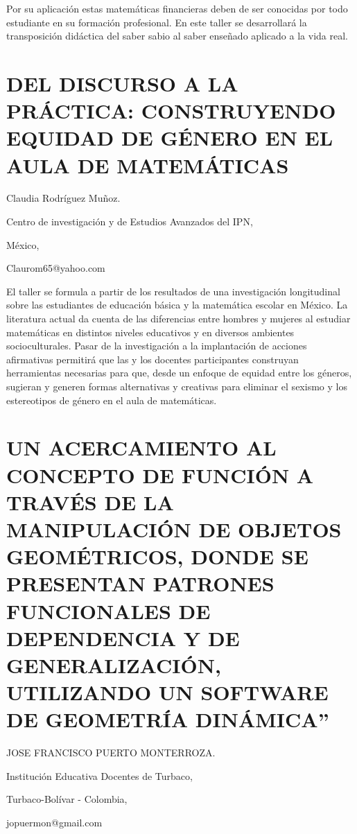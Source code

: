 Por su aplicación estas matemáticas financieras deben de ser conocidas
por todo estudiante en su formación profesional. En este taller se
desarrollará la transposición didáctica del saber sabio al saber enseñado
aplicado a la vida real.


\section{\uppercase{ Del discurso a la práctica: construyendo equidad de
género en el aula de Matemáticas}}

\begin{datos}

Claudia Rodríguez Muñoz.

Centro de investigación y de Estudios Avanzados del IPN,

México,

Claurom65@yahoo.com

\end{datos}

El taller se formula a partir de los resultados de una investigación
longitudinal sobre las estudiantes de educación básica y la matemática
escolar en México. La literatura actual da cuenta de las diferencias
entre hombres y mujeres al estudiar matemáticas en distintos niveles
educativos y en diversos ambientes socioculturales. Pasar de la investigación
a la implantación de acciones afirmativas permitirá que las y los
docentes participantes construyan herramientas necesarias para que,
desde un enfoque de equidad entre los géneros, sugieran y generen
formas alternativas y creativas para eliminar el sexismo y los estereotipos
de género en el aula de matemáticas.


\section{UN ACERCAMIENTO AL CONCEPTO DE FUNCIÓN A TRAVÉS DE LA MANIPULACIÓN
DE OBJETOS GEOMÉTRICOS, DONDE SE PRESENTAN PATRONES FUNCIONALES DE
DEPENDENCIA Y DE GENERALIZACIÓN, UTILIZANDO UN SOFTWARE DE GEOMETRÍA
DINÁMICA”}

\begin{datos}

JOSE FRANCISCO PUERTO MONTERROZA.

Institución Educativa Docentes de Turbaco,

Turbaco-Bolívar - Colombia,

jopuermon@gmail.com

\end{datos}

